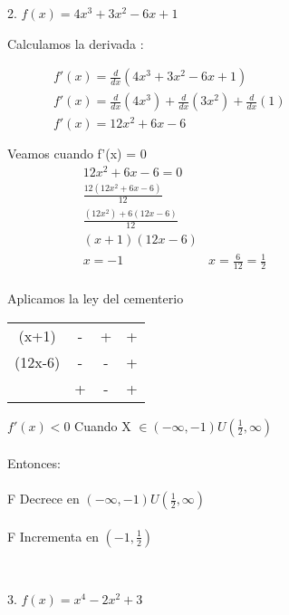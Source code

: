 \documentclass{report}
\begin{document}
\vspace{20cm}
{\Large 2.  $ f(x) = 4x^3+ 3x^2 -6x +1$ \par}
{\Large\justify
Calculamos la derivada :

\begin{align*}
     & f'(x) = \frac{d }{d x}  \left(  4x^3+ 3x^2 -6x +1  \right)    &  &  &  &  &  &  &  &  &  &  &  &  &  & \\
     & f'(x) = \frac{d}{dx } \left(4x^3 \right) + \frac{d}{dx }\left(3x^2\right)   +\frac{d}{dx}\left(1\right)  \\
     & f'(x) =    12x^2 +6x -6                         \\
     &                                                \\
\end{align*}
Veamos cuando f'(x) = 0
\begin{align*}
     &  12x^2 +6x -6 =  0 &  &  &  &  &  &  &  &  &  &  &  &  &  & \\
     &  \frac{ 12(12x^2 +6x -6)}{12}                                          \\
     & \frac{ (12x^2) + 6(12x-6)}{12}\\
     & (x+1) (12x-6)\\
     & x = -1 & x = \frac{6}{12} =\frac{1}{2} \\
\end{align*}

Aplicamos la ley del cementerio

\begin{tabular}{c c c c }
     (x+1)  & - & + & + \\ 
     (12x-6)& - & - & +\\
            & + & - &  + \\
\end{tabular}

$ f'(x) < 0 $ Cuando X $ \in \left( -\infty,-1 \right) U \left( \frac{1}{2},\infty\right)$\\
\\Entonces:\\\\
F  Decrece en $\left( -\infty,-1 \right) U \left( \frac{1}{2},\infty\right)$\\\\
F Incrementa en $ \left(-1 , \frac{1}{2}\right)$\\
}\\
\vspace{10cm}
{\Large 3.  $ f(x) = x^4 -2x^2 +3 $\par}
\end{document}
